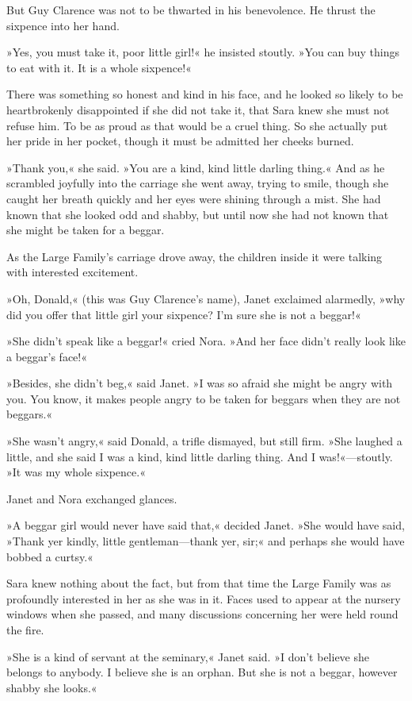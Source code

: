 But Guy Clarence was not to be thwarted in his benevolence. He thrust the sixpence into her hand.

»Yes, you must take it, poor little girl!« he insisted stoutly. »You can buy things to eat with it. It is a whole sixpence!«

There was something so honest and kind in his face, and he looked so likely to be heartbrokenly disappointed if she did not take it, that Sara knew she must not refuse him. To be as proud as that would be a cruel thing. So she actually put her pride in her pocket, though it must be admitted her cheeks burned.

»Thank you,« she said. »You are a kind, kind little darling thing.« And as he scrambled joyfully into the carriage she went away, trying to smile, though she caught her breath quickly and her eyes were shining through a mist. She had known that she looked odd and shabby, but until now she had not known that she might be taken for a beggar.

As the Large Family's carriage drove away, the children inside it were talking with interested excitement.

»Oh, Donald,« (this was Guy Clarence's name), Janet exclaimed alarmedly, »why did you offer that little girl your sixpence? I'm sure she is not a beggar!«

»She didn't speak like a beggar!« cried Nora. »And her face didn't really look like a beggar's face!«

»Besides, she didn't beg,« said Janet. »I was so afraid she might be angry with you. You know, it makes people angry to be taken for beggars when they are not beggars.«

»She wasn't angry,« said Donald, a trifle dismayed, but still firm. »She laughed a little, and she said I was a kind, kind little darling thing. And I was!«—stoutly. »It was my whole sixpence.«

Janet and Nora exchanged glances.

»A beggar girl would never have said that,« decided Janet. »She would have said, »Thank yer kindly, little gentleman—thank yer, sir;« and perhaps she would have bobbed a curtsy.«

Sara knew nothing about the fact, but from that time the Large Family was as profoundly interested in her as she was in it. Faces used to appear at the nursery windows when she passed, and many discussions concerning her were held round the fire.

»She is a kind of servant at the seminary,« Janet said. »I don't believe she belongs to anybody. I believe she is an orphan. But she is not a beggar, however shabby she looks.«

